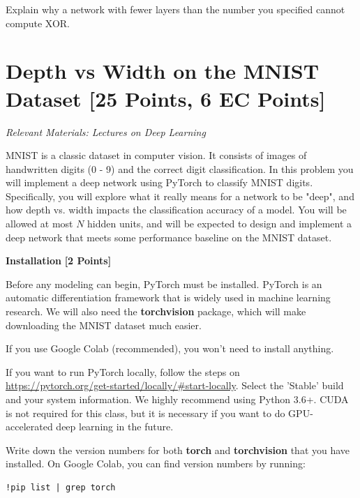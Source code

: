 Explain why a network with fewer layers than the number you specified cannot compute XOR.


\begin{subsolution}


\end{subsolution}


\newpage
\section{Depth vs Width on the MNIST Dataset  [25 Points, 6 EC Points]}

\textit{Relevant Materials: Lectures on Deep Learning}

MNIST is a classic dataset in computer vision. It consists of images of handwritten digits (0 - 9) and the correct digit classification. In this problem you will implement a deep network using PyTorch to classify MNIST digits. Specifically, you will explore what it really means for a network to be "deep", and how depth vs. width impacts the classification accuracy of a model. You will be allowed at most $N$ hidden units, and will be expected to design and implement a deep network that meets some performance baseline on the MNIST dataset.

\medskip

\problem \textbf{Installation} \textbf{[2 Points]}


Before any modeling can begin, PyTorch must be installed. PyTorch is an automatic differentiation framework that is widely used in machine learning research.  We will also need the \textbf{torchvision} package, which will make downloading the MNIST dataset much easier. 

If you use Google Colab (recommended), you won't need to install anything.

If you want to run PyTorch locally, follow the steps on \\
\url{https://pytorch.org/get-started/locally/#start-locally}. Select the 'Stable' build and your system information. We highly recommend using Python 3.6+. CUDA is not required for this class, but it is necessary if you want to do GPU-accelerated deep learning in the future.

Write down the version numbers for both \textbf{torch} and \textbf{torchvision} that you have installed. On Google Colab, you can find version numbers by running: \begin{verbatim}!pip list | grep torch\end{verbatim}

